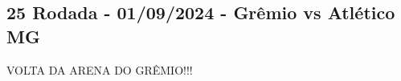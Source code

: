 \newpage
\subsection{25 Rodada - 01/09/2024 - Grêmio vs Atlético MG}

\begin{figure}[H]
    \centering
    
\end{figure}

VOLTA DA ARENA DO GRÊMIO!!!